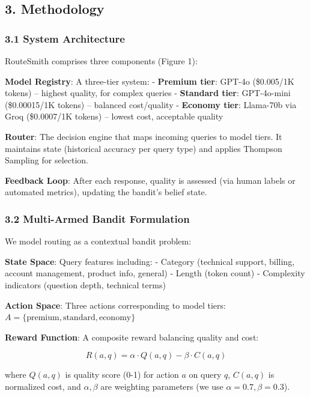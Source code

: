 \documentclass[
  11pt,
]{article}
\begin{document}
\hypertarget{methodology}{%
\subsection{3. Methodology}\label{methodology}}

\hypertarget{system-architecture}{%
\subsubsection{3.1 System Architecture}\label{system-architecture}}

RouteSmith comprises three components (Figure 1):

\textbf{Model Registry}: A three-tier system: - \textbf{Premium tier}:
GPT-4o (\$0.005/1K tokens) -- highest quality, for complex queries -
\textbf{Standard tier}: GPT-4o-mini (\$0.00015/1K tokens) -- balanced
cost/quality - \textbf{Economy tier}: Llama-70b via Groq (\$0.0007/1K
tokens) -- lowest cost, acceptable quality

\textbf{Router}: The decision engine that maps incoming queries to model
tiers. It maintains state (historical accuracy per query type) and
applies Thompson Sampling for selection.

\textbf{Feedback Loop}: After each response, quality is assessed (via
human labels or automated metrics), updating the bandit's belief state.

\hypertarget{multi-armed-bandit-formulation}{%
\subsubsection{3.2 Multi-Armed Bandit
Formulation}\label{multi-armed-bandit-formulation}}

We model routing as a contextual bandit problem:

\textbf{State Space}: Query features including: - Category (technical
support, billing, account management, product info, general) - Length
(token count) - Complexity indicators (question depth, technical terms)

\textbf{Action Space}: Three actions corresponding to model tiers:
\(A = \{\text{premium}, \text{standard}, \text{economy}\}\)

\textbf{Reward Function}: A composite reward balancing quality and cost:

\[R(a, q) = \alpha \cdot Q(a, q) - \beta \cdot C(a, q)\]

where \(Q(a,q)\) is quality score (0-1) for action \(a\) on query \(q\),
\(C(a,q)\) is normalized cost, and \(\alpha, \beta\) are weighting
parameters (we use \(\alpha=0.7, \beta=0.3\)).
\end{document}
